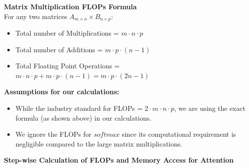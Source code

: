 \documentclass{article}
\begin{document}
\vspace{0.2cm}

\noindent \textbf{Matrix Multiplication FLOPs Formula} \\
For any two matrices $A_{m \times n} \times B_{n \times p}$:
\begin{itemize}
    \item Total number of Multiplications = $m \cdot n \cdot p$
    \item Total number of Additions = $m \cdot p \cdot (n - 1)$
    \item Total Floating Point Operations = $m \cdot n \cdot p + m \cdot p \cdot (n - 1) = m \cdot p \cdot (2n - 1)$
\end{itemize}

\noindent \textbf{Assumptions for our calculations:}
\begin{itemize}
    \item While the industry standard for FLOPs = $2 \cdot m \cdot n \cdot p$, we are using the exact formula (as shown above) in our calculations.
    \item We ignore the FLOPs for $softmax$ since its computational requirement is negligible compared to the large matrix multiplications.
\end{itemize}

\vspace{1.5em}
\noindent \textbf{Step-wise Calculation of FLOPs and Memory Access for Attention}
\end{document}
